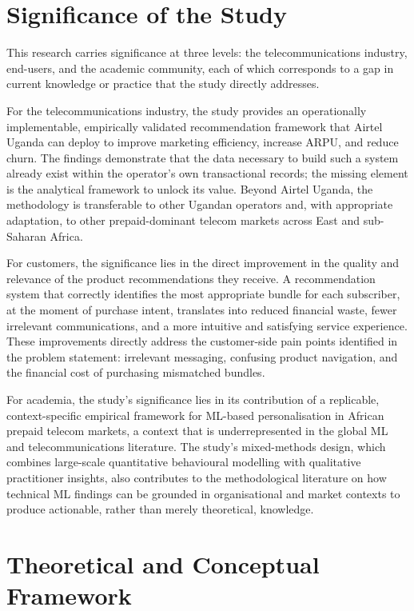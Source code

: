 \section{Significance of the Study}

This research carries significance at three levels:  the telecommunications industry, end-users, and the academic community, each of which corresponds to a gap in current knowledge or practice that the study directly addresses.

For the telecommunications industry, the study provides an operationally implementable, empirically validated recommendation framework that Airtel Uganda can deploy to improve marketing efficiency, increase ARPU, and reduce churn. The findings demonstrate that the data necessary to build such a system already exist within the operator's own transactional records; the missing element is the analytical framework to unlock its value. Beyond Airtel Uganda, the methodology is transferable to other Ugandan operators and, with appropriate adaptation, to other prepaid-dominant telecom markets across East and sub-Saharan Africa.

For customers, the significance lies in the direct improvement in the quality and relevance of the product recommendations they receive. A recommendation system that correctly identifies the most appropriate bundle for each subscriber, at the moment of purchase intent, translates into reduced financial waste, fewer irrelevant communications, and a more intuitive and satisfying service experience. These improvements directly address the customer-side pain points identified in the problem statement: irrelevant messaging, confusing product navigation, and the financial cost of purchasing mismatched bundles.

For academia, the study's significance lies in its contribution of a replicable, context-specific empirical framework for ML-based personalisation in African prepaid telecom markets, a context that is underrepresented in the global ML and telecommunications literature. The study's mixed-methods design, which combines large-scale quantitative behavioural modelling with qualitative practitioner insights, also contributes to the methodological literature on how technical ML findings can be grounded in organisational and market contexts to produce actionable, rather than merely theoretical, knowledge.


\section{Theoretical and Conceptual Framework}


